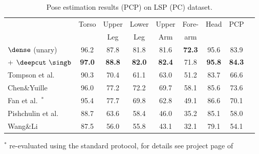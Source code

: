 \tabcolsep 1.5pt
\begin{table}[tbp]
 \scriptsize
  \centering
  \begin{tabular}{@{} l cc ccc ccc@{}}
    \toprule
    &Torso & Upper & Lower & Upper & Fore- & Head  & PCP \\
    &   & Leg   & Leg& Arm   & arm   &       &       \\
    \midrule
    
    
    
     
    \midrule
    $\dense$ (unary)          & 96.2  & 87.8  & 81.8  & 81.6  & \textbf{72.3}  & 95.6 & 83.9 \\
    \quad + $\deepcut~\singb$ & \textbf{97.0}  & \textbf{88.8}  & \textbf{82.0}  & \textbf{82.4}  & 71.8  & \textbf{95.8} & \textbf{84.3} \\
     
    \midrule
    Tompson et al.~\cite{tompson14nips}& 90.3  & 70.4  & 61.1  & 63.0  & 51.2  & 83.7 & 66.6 \\
    Chen\&Yuille~\cite{chen14nips}& 96.0  & 77.2  & 72.2  & 69.7  & 58.1  & 85.6 & 73.6 \\
    Fan et al.~\cite{fan15cvpr}$^*$
    & 95.4  & 77.7  & 69.8  & 62.8  & 49.1  & 86.6 & 70.1 \\
    Pishchulin et al.~\cite{pishchulin13iccv}& 88.7  & 63.6  & 58.4  & 46.0  & 35.2  & 85.1 & 58.0 \\
    Wang\&Li~\cite{wang13cvpr}& 87.5  & 56.0  & 55.8  & 43.1  & 32.1  & 79.1 & 54.1 \\
    \bottomrule
  \end{tabular}
  
  $^*$ re-evaluated using the standard protocol, for details see project page of~\cite{fan15cvpr}
  \caption[]{Pose estimation results (PCP) on LSP (PC) dataset.}
    \vspace{-1.5em}
  \label{tab:multicut:lsp-pc-pcp}
\end{table}
